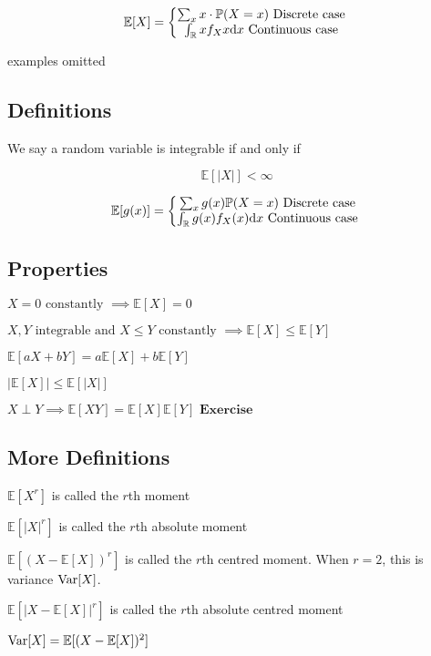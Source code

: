 $$
\mathbb{E}[X]=
\bigg\{
\begin{matrix}
\sum_x x\cdot\mathbb{P}(X=x)\text{ Discrete case }
\\
\int_\mathbb{R} xf_X{x}\text{d}x\text{ Continuous case }
\end{matrix}
$$

examples omitted

\subsection{Definitions}

We say a random variable is integrable if and only if

$$
\mathbb{E}[|X|]<\infty
$$

$$
\mathbb{E}[g(x)]=
\bigg\{
\begin{matrix}
\sum_x g(x)\mathbb{P}(X=x)\text{ Discrete case }
\\
\int_{\mathbb{R}}g(x)f_X(x)\text{d}x\text{ Continuous case }
\end{matrix}
$$

\subsection{Properties}

$
X=0 \text{ constantly } \implies \mathbb{E}[X]=0
$

$
X,Y\text{ integrable and }X\leq Y\text{ constantly }\implies \mathbb{E}[X]\leq\mathbb{E}[Y]
$

$
\mathbb{E}[aX+bY]=a\mathbb{E}[X]+b\mathbb{E}[Y]
$

$
|\mathbb{E}[X]|\leq\mathbb{E}[|X|]
$

$
X\perp Y\implies\mathbb{E}[XY]=\mathbb{E}[X]\mathbb{E}[Y] \textbf{ Exercise}
$

\bigskip

\subsection{More Definitions}

$\mathbb{E}[X^r]$ is called the $r$th moment

$\mathbb{E}[|X|^r]$ is called the $r$th absolute moment

$\mathbb{E}[(X-\mathbb{E}[X])^r]$ is called the $r$th centred moment. When $r=2$, this is variance $\text{Var}[X]$.

$\mathbb{E}[|X-\mathbb{E}[X]|^r]$ is called the $r$th absolute centred moment

$
\text{Var}[X]=\mathbb{E}[(X-\mathbb{E}[X])^2]
$

